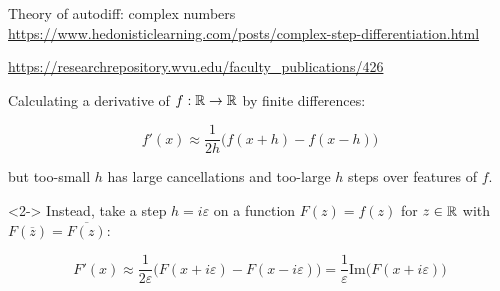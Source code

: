 \documentclass[aspectratio=169]{beamer}
\begin{document}




\begin{frame}{Theory of autodiff: complex numbers}
\vspace{0.3 cm}
{\scriptsize \textcolor{blue}{\url{https://www.hedonisticlearning.com/posts/complex-step-differentiation.html}}}

{\scriptsize \textcolor{blue}{\url{https://researchrepository.wvu.edu/faculty_publications/426}}}

\vspace{0.3 cm}
Calculating a derivative of $f : \Bbb{R} \to \Bbb{R}$ by finite differences:

\[ f'(x) \approx \frac{1}{2h} \bigg( f(x + h) - f(x - h) \bigg) \]

but too-small $h$ has large cancellations and too-large $h$ steps over features of $f$.

\vspace{0.3 cm}
\begin{uncoverenv}<2->
Instead, take a step $h = i\varepsilon$ on a function $F(z) = f(z)$ for $z \in \Bbb{R}$ with $F(\overline{z}) = \overline{F(z)}$:

\[ F'(x) \approx \frac{1}{2\varepsilon} \bigg( F(x + i\varepsilon) - F(x - i\varepsilon) \bigg) = \frac{1}{\varepsilon} \mbox{Im}\bigg( F(x + i\varepsilon) \bigg) \]
\end{uncoverenv}

\vspace{0.3 cm}
\end{frame}
\end{document}
